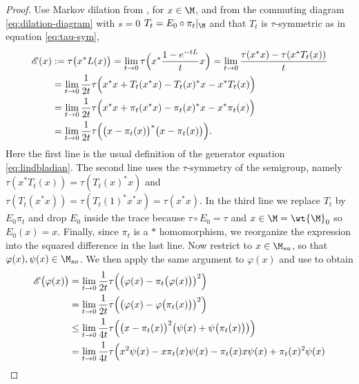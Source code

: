 \documentclass[sn-mathphys-num]{sn-jnl}
\begin{document}
\begin{proof}
Use Markov dilation from , for $x\in\M$, and from the commuting diagram \eqref{eq:dilation-diagram} with $s=0$ $T_t=E_0\circ\pi_t|_{\M}$ and that $T_t$ is $\tau$-symmetric as in equation \eqref{eq:tau-sym},
\begin{align*}
\mathscr{E}(x)
      &:= \tau   \bigl(x^{*}  {L}(x)\bigr) = \lim_{t\to0}
         \tau   \Bigl(
           x^{*}  \frac{1-e^{-t{L}}}{t}  x
         \Bigr) = \lim_{t\to0}
         \frac{\tau(x^{*}x)-\tau(x^{*}T_t(x))}{t} \\
      &= \lim_{t\to0}
         \frac{1}{2t}
         \tau   \Bigl(
           x^*x+T_t(x^*x)-T_t(x)^*  x-x^*  T_t(x)
         \Bigr) \\
    &=\lim_{t\to0}
         \frac{1}{2t}
         \tau   \Bigl(
           x^*x+\pi_t(x^*x)-\pi_t(x)^*  x-x^*  \pi_t(x)
         \Bigr) \\
      &= \lim_{t\to0}
         \frac{1}{2t}
         \tau   \Bigl(\bigl(x-\pi_t(x)\bigr)^*\bigl(x-\pi_t(x)\bigr)\Bigr).
\end{align*}
Here the first line is the usual definition of the generator equation \eqref{eq:lindbladian}.
The second line uses the $\tau$-symmetry of the semigroup, namely $\tau(x^{*}T_t(x))=\tau(T_t(x)^{*}x)$ and $\tau(T_t(x^*x))=\tau(T_t(1)^{*}x^*x)=\tau(x^*x)$.
In the third line we replace $T_t$ by $E_0\pi_t$ and drop $E_0$ inside the trace because $\tau\circ E_0=\tau$ and $x\in\M=\wt{\M}_0$ so $E_0(x)=x$.
Finally, since $\pi_t$ is a $*$ homomorphism, we reorganize the expression into the squared difference in the last line.
Now restrict to $x\in\M_{sa}$, so that $\varphi(x),\psi(x)\in\M_{sa}$. We then apply the same argument to $\varphi(x)$ and use  to obtain
\[
\begin{aligned}
\mathscr{E}   \bigl(\varphi(x)\bigr)
  &= \lim_{t\to0}\frac{1}{2t}
     \tau   \Bigl(
       \bigl(\varphi(x)-\pi_t   \bigl(\varphi(x)\bigr)\bigr)^2
     \Bigr)                            \\
  &= \lim_{t\to0}\frac{1}{2t}
     \tau   \Bigl(
       \bigl(\varphi(x)-\varphi   \bigl(\pi_t(x)\bigr)\bigr)^2
     \Bigr)                            \\
  &\le
     \lim_{t\to0}\frac{1}{4t}
     \tau   \Bigl(
       \bigl(x-\pi_t(x)\bigr)^{2}
       \bigl(\psi(x)+\psi   \bigl(\pi_t(x)\bigr)\bigr)
     \Bigr)                            \\
  &= \lim_{t\to0}\frac{1}{4t}
     \tau   \Bigl(
       x^{2}\psi(x)-x  \pi_t(x)\psi(x)-\pi_t(x)  x\psi(x)+\pi_t(x)^{2}\psi(x)

\end{aligned}\]
\end{proof}
\end{document}
